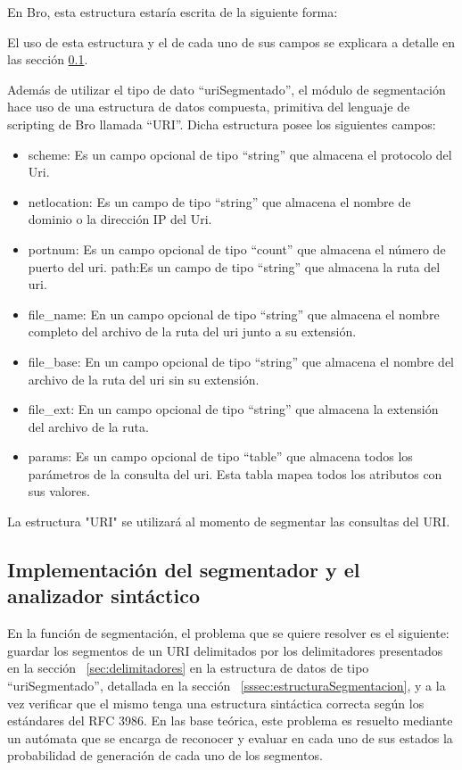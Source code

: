 En Bro, esta estructura estaría escrita de la siguiente forma:

El uso de esta estructura y el de cada uno de sus campos se explicara a detalle en las sección \ref{subsec:implementacionAutom}.

Además de utilizar el tipo de dato “uriSegmentado”, el módulo de segmentación hace uso de una estructura de datos compuesta, primitiva del lenguaje de scripting de Bro llamada  “URI”. Dicha estructura posee los siguientes campos:

\begin{itemize}
\item scheme: Es un campo opcional de tipo “string” que almacena el protocolo del Uri.

\item netlocation: Es un campo de tipo “string” que almacena el nombre de dominio o la dirección IP del Uri.

\item portnum: Es un campo opcional de tipo “count”  que almacena el número de puerto del uri.
path:Es un campo de tipo “string” que almacena la ruta del uri.

\item file\_name: En un campo opcional de tipo “string” que almacena el nombre completo  del archivo de la ruta del uri junto a su extensión.

\item file\_base: En un campo opcional de tipo “string” que almacena el nombre  del archivo de la ruta del uri sin su extensión.

\item file\_ext: En un campo opcional de tipo “string” que almacena la extensión del archivo de la ruta.

\item params: Es un campo opcional de tipo “table” que almacena todos los parámetros de la consulta del uri. Esta tabla mapea todos los atributos con sus valores.
\end{itemize}

La estructura "URI" se utilizará al momento de segmentar las consultas del URI.

\subsection{Implementación del segmentador y el analizador sintáctico}\label{subsec:implementacionAutom}

En la función de segmentación, el problema que se quiere resolver es el siguiente: guardar los segmentos de un URI delimitados por los delimitadores presentados en la sección ~\ref{sec:delimitadores} en la estructura de datos de tipo “uriSegmentado”, detallada en la sección ~\ref{sssec:estructuraSegmentacion}, y a la vez verificar que el mismo tenga una estructura sintáctica correcta según los estándares del RFC 3986. En las base teórica, este problema es resuelto  mediante un autómata que se encarga de reconocer y evaluar en cada uno de sus estados la probabilidad de generación de cada uno de los segmentos. 

